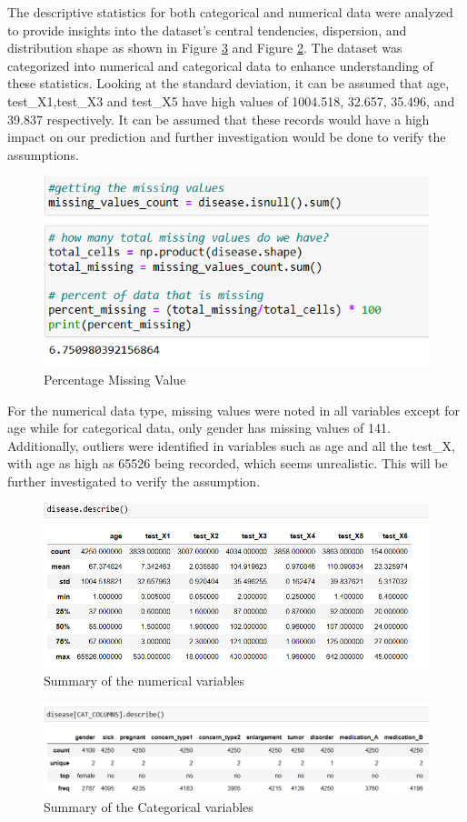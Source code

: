 \documentclass[a4paper]{article}
\begin{document}
 The descriptive statistics for both categorical and numerical data were analyzed to provide insights into the dataset’s central tendencies, dispersion, and distribution shape as shown in Figure \ref{fig:cat} and Figure \ref{fig:num}. The dataset was categorized into numerical and categorical data to enhance understanding of these statistics. Looking at the standard deviation, it can be assumed that age, test\_X1,test\_X3 and test\_X5 have high values of 1004.518, 32.657, 35.496, and 39.837 respectively. It can be assumed that these records would have a high impact on our prediction and further investigation would be done to verify the assumptions.
\begin{figure}
    \centering
    \includegraphics[width=0.5\linewidth]{missing_value.png}
    \caption{Percentage Missing Value}
    \label{fig:missing}
\end{figure}
For the numerical data type, missing values were noted in all variables except for age while for categorical data, only gender has missing values of 141. Additionally, outliers were identified in variables such as age and all the test\_X, with age as high as 65526 being recorded, which seems unrealistic. This will be further investigated to verify the assumption.
\begin{figure}
    \centering
    \includegraphics[width=0.5\linewidth]{describe.png}
    \caption{Summary of the numerical variables}
    \label{fig:num}
\end{figure}
\begin{figure}
    \centering
    \includegraphics[width=0.5\linewidth]{categorical.png}
    \caption{Summary of the Categorical variables}
    \label{fig:cat}
\end{figure}
\end{document}
